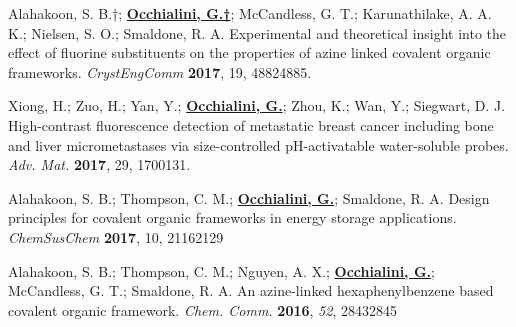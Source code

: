 \begin{rSection}{}
  Alahakoon, S. B.†; \underline{\textbf{Occhialini, G.†}}; McCandless, G. T.; Karunathilake, A. A. K.; Nielsen, S. O.; Smaldone, R. A. Experimental and theoretical insight into the effect of fluorine substituents on the properties of azine linked covalent organic frameworks. \textit{CrystEngComm} \textbf{2017}, 19, 4882\textemdash{}4885.
  
  Xiong, H.; Zuo, H.; Yan, Y.; \underline{\textbf{Occhialini, G.}}; Zhou, K.; Wan, Y.; Siegwart, D. J. High-contrast fluorescence detection of metastatic breast cancer including bone and liver micrometastases via size-controlled pH-activatable water-soluble probes. \textit{Adv. Mat.} \textbf{2017}, 29, 1700131.
  
  Alahakoon, S. B.; Thompson, C. M.; \underline{\textbf{Occhialini, G.}}; Smaldone, R. A. Design principles for covalent organic frameworks in energy storage applications. \textit{ChemSusChem} \textbf{2017}, 10, 2116\textemdash{}2129

  Alahakoon, S. B.; Thompson, C. M.; Nguyen, A. X.; \underline{\textbf{Occhialini, G.}}; McCandless, G. T.; Smaldone, R. A. An azine-linked hexaphenylbenzene based covalent organic framework. \textit{Chem. Comm.} \textbf{2016}, \textit{52}, 2843\textemdash{}2845

\end{rSection}
